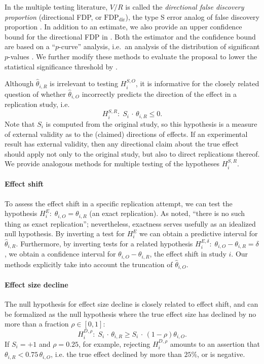 \documentclass[aoas, preprint]{imsart}
\theoremstyle{definition}
\theoremstyle{custom}
\newcommand{\htheta}{\hat{\theta}}
\newcommand{\FDPd}{\text{FDP}_\text{dir}}
\begin{document}
  In the multiple testing literature, $V/R$ is called the {\em directional false discovery proportion} (directional FDP, or $\FDPd$), the type S error analog of false discovery proportion \citep[FDP;][]{Benjamini:2000ka}. In addition to an estimate, we also provide an upper confidence bound for the directional FDP in . Both the estimator and the confidence bound are based on a ``$p$-curve'' analysis, i.e.\ an analysis of the distribution of significant $p$-values \citep{Simonsohn:2014fa}. We further modify these methods to evaluate the proposal to lower the statistical significance threshold by \citet{Benjamin:2018gh}.

  Although $\htheta_{i,R}$ is irrelevant to testing $H_i^{S,O}$, it is informative for the closely related question of whether $\htheta_{i,O}$ incorrectly predicts the direction of the effect in a replication study, i.e.
  \[
    H_i^{S,R}:\; S_i \,\cdot\, \theta_{i,R} \le 0.
  \]
  Note that $S_i$ is computed from the original study, so this hypothesis is a measure of external validity as to the (claimed) directions of effects. If an experimental result has external validity, then any directional claim about the true effect should apply not only to the original study, but also to direct replications thereof. We provide analogous methods for multiple testing of the hypotheses $H_i^{S,R}$.

  \paragraph{Effect shift} To assess the effect shift in a specific replication attempt, we can test the hypothesis $H_i^E:\; \theta_{i,O} = \theta_{i,R}$ (an exact replication). As \citet{Anderson:2016gs} noted, ``there is no such thing as exact replication''; nevertheless, exactness serves usefully as an idealized null hypothesis. By inverting a test for $H_i^E$ we can obtain a predictive interval for $\htheta_{i,R}$. Furthermore, by inverting tests for a related hypothesis $H_i^{E,\delta}:\; \theta_{i,O} - \theta_{i,R} = \delta$, we obtain a confidence interval for $\theta_{i,O} - \theta_{i,R}$, the effect shift in study $i$. Our methods explicitly take into account the truncation of $\htheta_{i,O}$.

  \paragraph{Effect size decline} The null hypothesis for effect size decline is closely related to effect shift, and can be formalized as the null hypothesis where the true effect size has declined by no more than a fraction $\rho \in [0, 1]$:
  \[
    H_i^{D,\rho}:\; S_i \,\cdot\, \theta_{i,R} \ge S_i \,\cdot\, (1 - \rho) \theta_{i,O}.
  \]
  If $S_i = +1$ and $\rho=0.25$, for example, rejecting $H_i^{D,\rho}$ amounts to an assertion that $\theta_{i,R} < 0.75 \,\theta_{i,O}$, i.e. the true effect declined by more than $25\%$, or is negative.
\end{document}
